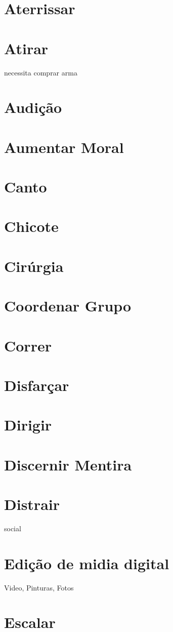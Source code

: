 \section{Aterrissar}
\section{Atirar} necessita comprar arma
\section{Audição}
\section{Aumentar Moral}
\section{Canto}
\section{Chicote}
\section{Cirúrgia}
\section{Coordenar Grupo}
\section{Correr}
\section{Disfarçar}
\section{Dirigir}
\section{Discernir Mentira}
\section{Distrair} social
\section{Edição de midia digital} Video, Pinturas, Fotos
\section{Escalar}
